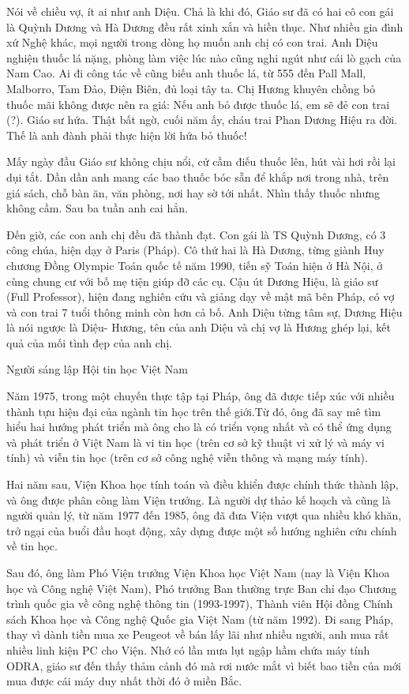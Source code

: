 Nói về chiều vợ, ít ai như anh Diệu. Chả là khi đó, Giáo sư đã có hai cô con gái là Quỳnh Dương và Hà Dương đều rất xinh xắn và hiền thục. Như nhiều gia đình xứ Nghệ khác, mọi người trong dòng họ muốn anh chị có con trai.
Anh Diệu nghiện thuốc lá nặng, phòng làm việc lúc nào cũng nghi ngút như cái lò gạch của Nam Cao. Ai đi công tác về cũng biếu anh thuốc lá, từ 555 đến Pall Mall, Malborro, Tam Đảo, Điện Biên, đủ loại tây ta.
Chị Hương khuyên chồng bỏ thuốc mãi không được nên ra giá: Nếu anh bỏ được thuốc lá, em sẽ đẻ con trai (?). Giáo sư hứa. Thật bất ngờ, cuối năm ấy, cháu trai Phan Dương Hiệu ra đời. Thế là anh đành phải thực hiện lời hứa bỏ thuốc! 


Mấy ngày đầu Giáo sư không chịu nổi, cứ cầm điếu thuốc lên, hút vài hơi rồi lại dụi tắt. Dần dần anh mang các bao thuốc bóc sẵn để khắp nơi trong nhà, trên giá sách, chỗ bàn ăn, văn phòng, nơi hay sờ tới nhất. Nhìn thấy thuốc nhưng không cầm. Sau ba tuần anh cai hẳn.

Đến giờ, các con anh chị đều đã thành đạt. Con gái là TS Quỳnh Dương, có 3 công chúa, hiện dạy ở Paris (Pháp). Cô thứ hai là Hà Dương, từng giành Huy chương Đồng Olympic Toán quốc tế năm 1990, tiến sỹ Toán hiện ở Hà Nội, ở cùng chung cư với bố mẹ tiện giúp đỡ các cụ. Cậu út Dương Hiệu, là giáo sư (Full Professor), hiện đang nghiên cứu và giảng dạy về mật mã bên Pháp, có vợ và con trai 7 tuổi thông minh còn hơn cả bố. Anh Diệu từng tâm sự, Dương Hiệu là nói ngược là Diệu- Hương, tên của anh Diệu và chị vợ là Hương ghép lại, kết quả của mối tình đẹp của anh chị.


Người sáng lập Hội tin học Việt Nam

Năm 1975, trong một chuyến thực tập tại Pháp, ông đã được tiếp xúc với nhiều thành tựu hiện đại của ngành tin học trên thế giới.Từ đó, ông đã say mê tìm hiểu hai hướng phát triển mà ông cho là có triển vọng nhất và có thể ứng dụng và phát triển ở Việt Nam là vi tin học (trên cơ sở kỹ thuật vi xử lý và máy vi tính) và viễn tin học (trên cơ sở công nghệ viễn thông và mạng máy tính).

Hai năm sau, Viện Khoa học tính toán và điều khiển được chính thức thành lập, và ông được phân công làm Viện trưởng. Là người dự thảo kế hoạch và cũng là người quản lý, từ năm 1977 đến 1985, ông đã đưa Viện vượt qua nhiều khó khăn, trở ngại của buổi đầu hoạt động, xây dựng được một số hướng nghiên cứu chính về tin học.

Sau đó, ông làm Phó Viện trưởng Viện Khoa học Việt Nam (nay là Viện Khoa học và Công nghệ Việt Nam), Phó trưởng Ban thường trực Ban chỉ đạo Chương trình quốc gia về công nghệ thông tin (1993-1997), Thành viên Hội đồng Chính sách Khoa học và Công nghệ Quốc gia Việt Nam (từ năm 1992). Đi sang Pháp, thay vì dành tiền mua xe Peugeot về bán lấy lãi như nhiều người, anh mua rất nhiều linh kiện PC cho Viện. Nhớ có lần mưa lụt ngập hầm chứa máy tính ODRA, giáo sư đến thấy thảm cảnh đó mà rơi nước mắt vì biết bao tiền của mới mua được cái máy duy nhất thời đó ở miền Bắc.

